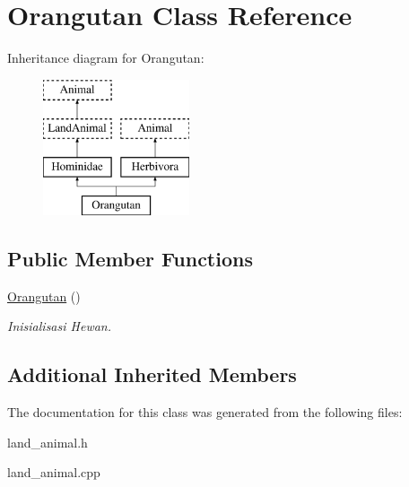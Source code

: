 \hypertarget{class_orangutan}{}\section{Orangutan Class Reference}
\label{class_orangutan}
Inheritance diagram for Orangutan\+:\begin{figure}[H]
\begin{center}
\leavevmode
\includegraphics[height=4.000000cm]{class_orangutan}
\end{center}
\end{figure}
\subsection*{Public Member Functions}
\begin{DoxyCompactItemize}
\item 
\hyperlink{class_orangutan_a2da89098271e7e34a0e81e3dc8d732f5}{Orangutan} ()\hypertarget{class_orangutan_a2da89098271e7e34a0e81e3dc8d732f5}{}\label{class_orangutan_a2da89098271e7e34a0e81e3dc8d732f5}

\begin{DoxyCompactList}\small\item\em Inisialisasi Hewan. \end{DoxyCompactList}\end{DoxyCompactItemize}
\subsection*{Additional Inherited Members}


The documentation for this class was generated from the following files\+:\begin{DoxyCompactItemize}
\item 
land\+\_\+animal.\+h\item 
land\+\_\+animal.\+cpp\end{DoxyCompactItemize}
